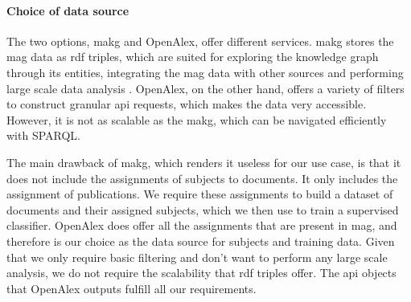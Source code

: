 \paragraph{Choice of data source} \mbox{}

The two options, \acrshort{makg} and OpenAlex, offer different services. \acrshort{makg} stores the \acrshort{mag} data as \acrshort{rdf} triples, which are suited for exploring the knowledge graph through its entities, integrating the \acrshort{mag} data with other sources and performing large scale data analysis \cite{faerber2019microsoft}. OpenAlex, on the other hand, offers a variety of filters to construct granular \acrshort{api} requests, which makes the data very accessible. However, it is not as scalable as the \acrshort{makg}, which can be navigated efficiently with SPARQL.

The main drawback of \acrshort{makg}, which renders it useless for our use case, is that it does not include the assignments of subjects to documents. It only includes the assignment of publications. We require these assignments to build a dataset of documents and their assigned subjects, which we then use to train a supervised classifier. OpenAlex does offer all the assignments that are present in \acrshort{mag}, and therefore is our choice as the data source for subjects and training data. Given that we only require basic filtering and don't want to perform any large scale analysis, we do not require the scalability that \acrshort{rdf} triples offer. The \acrshort{api} objects that OpenAlex outputs fulfill all our requirements.